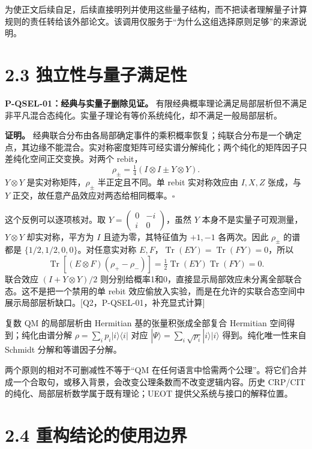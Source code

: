 \documentclass[
  11pt,
  oneside]{book}
\begin{document}
为使正文后续自足，后续直接明列并使用这些量子结构，而不把读者理解量子计算规则的责任转给该外部论文。该调用仅服务于``为什么这组选择原则足够''的来源说明。

\section{2.3 独立性与量子满足性}

\protect\hypertarget{p-qsel-01}{}{}

\textbf{P-QSEL-01：经典与实量子删除见证。}
有限经典概率理论满足局部层析但不满足非平凡混合态纯化。实量子理论有等价系统纯化，却不满足一般局部层析。

\textbf{证明。}
经典联合分布由各局部确定事件的乘积概率恢复；纯联合分布是一个确定点，其边缘不能混合。实对称密度矩阵可经实谱分解纯化；两个纯化的矩阵因子只差纯化空间正交变换。对两个
rebit， \[
\rho_\pm=\tfrac14(I\otimes I\pm Y\otimes Y).
\] \(Y\otimes Y\) 是实对称矩阵，\(\rho_\pm\) 半正定且不同。单 rebit
实对称效应由 \(I,X,Z\) 张成，与 \(Y\)
正交，故任意产品效应对两态给相同概率。\(\square\)

这个反例可以逐项核对。取
\(Y=\left(\begin{smallmatrix}0&-i\\i&0\end{smallmatrix}\right)\)，虽然
\(Y\) 本身不是实量子可观测量，\(Y\otimes Y\) 却实对称，平方为 \(I\)
且迹为零，其特征值为 \(+1,-1\) 各两次。因此 \(\rho_\pm\) 的谱都是
\(\{1/2,1/2,0,0\}\)。对任意实对称
\(E,F\)，\(\operatorname{Tr}(EY)=\operatorname{Tr}(FY)=0\)，所以 \[
\operatorname{Tr}[(E\otimes F)(\rho_+-\rho_-)]=
\tfrac12\operatorname{Tr}(EY)\operatorname{Tr}(FY)=0.
\] 联合效应 \((I+Y\otimes Y)/2\)
则分别给概率1和0，直接显示局部效应未分离全部联合态。这不是把一个禁用的单
rebit
效应偷放入实验，而是在允许的实联合态空间中展示局部层析缺口。{[}Q2，P-QSEL-01，补充显式计算{]}

复数 QM 的局部层析由 Hermitian 基的张量积张成全部复合 Hermitian
空间得到；纯化由谱分解 \(\rho=\sum_i p_i|i\rangle\langle i|\) 对应
\(|\Psi\rangle=\sum_i\sqrt{p_i}|i\rangle|i\rangle\) 得到。纯化唯一性来自
Schmidt 分解和等谱因子分解。

两个原则的相对不可删减性不等于``QM
在任何语言中恰需两个公理''。将它们合并成一个合取句，或移入背景，会改变公理条数而不改变逻辑内容。历史
CRP/CIT 的纯化、局部层析数学属于既有理论；UEOT
提供父系统与接口的解释位置。

\section{2.4 重构结论的使用边界}
\end{document}

